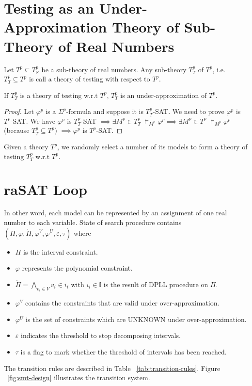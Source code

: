 \section{Testing as an Under-Approximation Theory of Sub-Theory of Real Numbers}
\begin{definition}
Let $T^p \subseteq T^p_\mathbb{R}$ be a sub-theory of real numbers. Any sub-theory $T^p_T$ of $T^p$, i.e. $T^p_T \subseteq T^p$ is call a theory of testing with respect to $T^p$.
\end{definition}

\begin{theorem}
If $T^p_T$ is a theory of testing w.r.t $T^p$, $T^p_T$ is an under-approximation of $T^p$.
\end{theorem}

\begin{proof}
Let $\varphi^p$ is a $\Sigma^p$-formula and suppose it is $T^p_T$-SAT. We need to prove $\varphi^p$ is $T^p$-SAT. We have $\varphi^p$ is $T^p_T$-SAT $\implies \exists M^p \in T^p_T \; \models_{M^p} \varphi^p \implies \exists M^p \in T^p \; \models_{M^p} \varphi^p$ {(because $T^p_T \subseteq T^p$)} $\implies \varphi^p$ is $T^p$-SAT.
\end{proof}

Given a theory $T^p$, we randomly select a number of its models to form a theory of testing $T^p_T$ w.r.t $T^p$.

\section{raSAT Loop}
In other word, each model can be represented by an assignment of one real number to each variable. 
State of search procedure contains  $(\Pi, \varphi, \mathring{\Pi}, \varphi^V, \varphi^U, \varepsilon, \tau)$ where 
\begin{itemize}
\item $\Pi$ is the interval constraint.
\item $\varphi$ represents the polynomial constraint.
\item $\mathring{\Pi} = \bigwedge\limits_{v_i \in V} v_i \in i_i$ with $i_i \in \mathbb{I}$ is the result of DPLL procedure on $\Pi$.
\item $\varphi^V$ contains the constraints that are valid under over-approximation.
\item $\varphi^U$ is the set of constraints which are UNKNOWN under over-approximation.
\item $\varepsilon$ indicates the threshold to stop decomposing intervals.
\item $\tau$ is a flag to mark whether the threshold of intervals has been reached.
\end{itemize}
The transition rules are described in Table ~\ref{tab:transition-rules}. Figure ~\ref{fig:smt-design} illustrates the transition system. 

